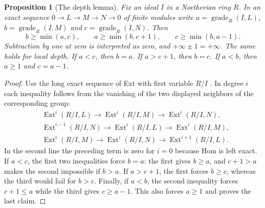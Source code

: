 \documentclass[11pt,oneside,openany]{book}
\newtheorem{proposition}[theorem]{Proposition}
\theoremstyle{definition}
\theoremstyle{remark}
\begin{document}
\begin{proposition}[The depth lemma]\label{res:DP-07}
Fix an ideal $I$ in a Noetherian ring $R$. In an exact sequence
$0\to L\to M\to N\to0$ of finite modules write
$a=\operatorname{grade}_R(I,L)$, $b=\operatorname{grade}_R(I,M)$
and $c=\operatorname{grade}_R(I,N)$. Then
\[
 b\ge\min(a,c),\qquad
 a\ge\min(b,c+1),\qquad
 c\ge\min(b,a-1).
\]
Subtraction by one at zero is interpreted as zero, and
$+\infty\pm1=+\infty$. The same holds for local depth.
If $a<c$, then $b=a$. If $a>c+1$, then $b=c$.
If $a<b$, then $a\ge1$ and $c=a-1$.
\end{proposition}
\begin{proof}
Use the long exact sequence of Ext with first variable $R/I$
\cite[Theorem ALG-10-C03-R02]{p103}.
In degree $i$ each inequality follows from the vanishing of
the two displayed neighbors of the corresponding group:
\[
 \begin{aligned}
  &\operatorname{Ext}^i(R/I,L) \to
      \operatorname{Ext}^i(R/I,M) \to \operatorname{Ext}^i(R/I,N),\\
  &\operatorname{Ext}^{i-1}(R/I,N) \to
      \operatorname{Ext}^i(R/I,L) \to \operatorname{Ext}^i(R/I,M),\\
  &\operatorname{Ext}^i(R/I,M) \to
      \operatorname{Ext}^i(R/I,N) \to \operatorname{Ext}^{i+1}(R/I,L).
 \end{aligned}
\]
In the second line the preceding term is zero for $i=0$ because Hom
is left exact. If $a<c$, the first two inequalities force $b=a$:
the first gives $b\ge a$, and $c+1>a$ makes the second impossible
if $b>a$. If $a>c+1$, the first forces $b\ge c$, whereas the third
would fail for $b>c$. Finally, if $a<b$,
the second inequality forces $c+1\le a$ while the third gives
$c\ge a-1$. This also forces $a\ge1$ and proves the last claim.
\end{proof}
\end{document}
